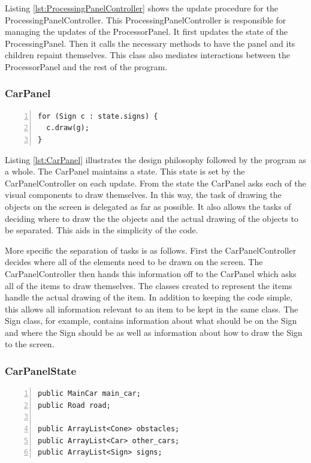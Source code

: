 \documentclass{article} %
\begin{document}
Listing \ref{lst:ProcessingPanelController} shows the update procedure for the ProcessingPanelController. This ProcessingPanelController is responsible for managing the updates of the ProcessorPanel. It first updates the state of the ProcessingPanel. Then it calls the necessary methods to have the panel and its children repaint themselves. This class also mediates interactions between the ProcessorPanel and the rest of the program.

\subsubsection{CarPanel}
\begin{lstlisting}[caption={Ask Signs to Draw Themselves},label={lst:CarPanel},numbers=left]
for (Sign c : state.signs) {
  c.draw(g);
}
\end{lstlisting}

Listing \ref{lst:CarPanel} illustrates the design philosophy followed by the program as a whole. 
The CarPanel maintains a state. This state is set by the CarPanelController on each update. From the state the CarPanel asks each of the visual components to draw themselves. 
In this way, the task of drawing the objects on the screen is delegated as far as possible.
It also allows the tasks of deciding where to draw the the objects and the actual drawing of the objects to be separated.
This aids in the simplicity of the code.

More specific the separation of tasks is as follows.
First the CarPanelController decides where all of the elements need to be drawn on the screen. The CarPanelController then hands this information off to the CarPanel which asks all of the items to draw themselves.
The classes created to represent the items handle the actual drawing of the item.
In addition to keeping the code simple, this allows all information relevant to an item to be kept in the same class.
The Sign class, for example, contains information about what should be on the Sign and where the Sign should be as well as information about how to draw the Sign to the screen.

\subsubsection{CarPanelState}
\begin{lstlisting}[caption={Car Panel State maintains all objects drawn on the screen},label={lst:CarPanelState},numbers=left]
public MainCar main_car;
public Road road;

public ArrayList<Cone> obstacles;
public ArrayList<Car> other_cars;
public ArrayList<Sign> signs;
\end{lstlisting}
\end{document}
